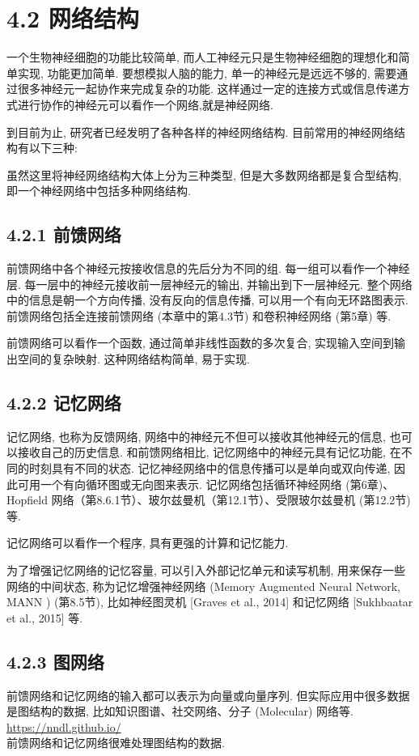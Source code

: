 \documentclass[10pt]{article}
\begin{document}
\section*{4.2 网络结构}
一个生物神经细胞的功能比较简单, 而人工神经元只是生物神经细胞的理想化和简单实现, 功能更加简单. 要想模拟人脑的能力, 单一的神经元是远远不够的, 需要通过很多神经元一起协作来完成复杂的功能. 这样通过一定的连接方式或信息传递方式进行协作的神经元可以看作一个网络,就是神经网络.

到目前为止, 研究者已经发明了各种各样的神经网络结构. 目前常用的神经网络结构有以下三种:

虽然这里将神经网络结构大体上分为三种类型, 但是大多数网络都是复合型结构, 即一个神经网络中包括多种网络结构.

\subsection*{4.2.1 前馈网络}
前馈网络中各个神经元按接收信息的先后分为不同的组. 每一组可以看作一个神经层. 每一层中的神经元接收前一层神经元的输出, 并输出到下一层神经元. 整个网络中的信息是朝一个方向传播, 没有反向的信息传播, 可以用一个有向无环路图表示. 前馈网络包括全连接前馈网络 (本章中的第4.3节) 和卷积神经网络 (第5章) 等.

前馈网络可以看作一个函数, 通过简单非线性函数的多次复合, 实现输入空间到输出空间的复杂映射. 这种网络结构简单, 易于实现.

\subsection*{4.2.2 记忆网络}
记忆网络, 也称为反馈网络, 网络中的神经元不但可以接收其他神经元的信息, 也可以接收自己的历史信息. 和前馈网络相比, 记忆网络中的神经元具有记忆功能, 在不同的时刻具有不同的状态. 记忆神经网络中的信息传播可以是单向或双向传递, 因此可用一个有向循环图或无向图来表示. 记忆网络包括循环神经网络 (第6章)、Hopfield 网络（第8.6.1节）、玻尔兹曼机（第12.1节）、受限玻尔兹曼机 (第12.2节) 等.

记忆网络可以看作一个程序, 具有更强的计算和记忆能力.

为了增强记忆网络的记忆容量, 可以引入外部记忆单元和读写机制, 用来保存一些网络的中间状态, 称为记忆增强神经网络 (Memory Augmented Neural Network, MANN ) (第8.5节), 比如神经图灵机 [Graves et al., 2014] 和记忆网络 [Sukhbaatar et al., 2015] 等.

\subsection*{4.2.3 图网络}
前馈网络和记忆网络的输入都可以表示为向量或向量序列. 但实际应用中很多数据是图结构的数据, 比如知识图谱、社交网络、分子 (Molecular) 网络等. \href{https://nndl.github.io/}{https://nndl.github.io/}\\
前馈网络和记忆网络很难处理图结构的数据.
\end{document}
